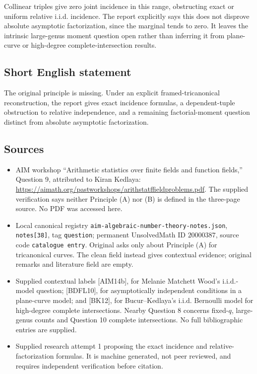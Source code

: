 \documentclass[11pt]{article}
\begin{document}
Collinear triples give zero joint incidence in this range, obstructing exact or uniform relative i.i.d. incidence. The report explicitly says this does not disprove absolute asymptotic factorization, since the marginal tends to zero. It leaves the intrinsic large-genus moment question open rather than inferring it from plane-curve or high-degree complete-intersection results.
\subsection{Short English statement}
The original principle is missing. Under an explicit framed-tricanonical reconstruction, the report gives exact incidence formulas, a dependent-tuple obstruction to relative independence, and a remaining factorial-moment question distinct from absolute asymptotic factorization.
\subsection{Sources}
\begin{itemize}
\item AIM workshop ``Arithmetic statistics over finite fields and function fields,'' Question 9, attributed to Kiran Kedlaya: \url{https://aimath.org/pastworkshops/arithstatffieldproblems.pdf}. The supplied verification says neither Principle (A) nor (B) is defined in the three-page source. No PDF was accessed here.
\item Local canonical registry \texttt{aim-algebraic-number-theory-notes.json}, \texttt{notes[38]}, tag \texttt{question}; permanent UnsolvedMath ID \(20000387\), source code \texttt{catalogue entry}. Original asks only about Principle (A) for tricanonical curves. The clean field instead gives contextual evidence; original remarks and literature field are empty.
\item Supplied contextual labels [AIM14b], for Melanie Matchett Wood's i.i.d.-model question; [BDFL10], for asymptotically independent conditions in a plane-curve model; and [BK12], for Bucur--Kedlaya's i.i.d. Bernoulli model for high-degree complete intersections. Nearby Question 8 concerns fixed-\(q\), large-genus counts and Question 10 complete intersections. No full bibliographic entries are supplied.
\item Supplied research attempt 1 proposing the exact incidence and relative-factorization formulas. It is machine generated, not peer reviewed, and requires independent verification before citation.
\end{itemize}
\end{document}
